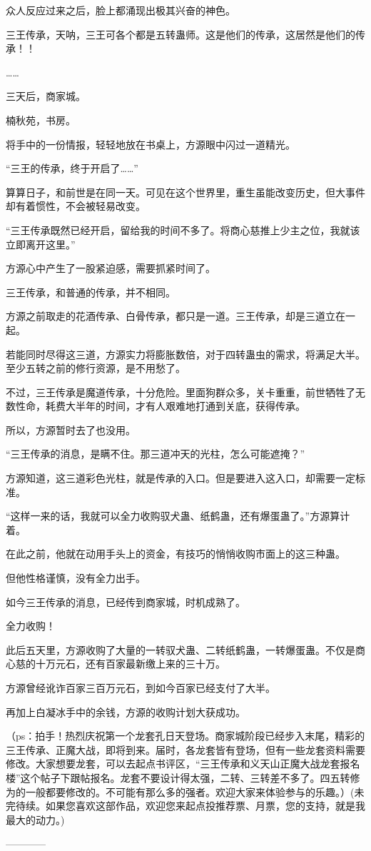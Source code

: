 \begin{this_body}
众人反应过来之后，脸上都涌现出极其兴奋的神色。

三王传承，天呐，三王可各个都是五转蛊师。这是他们的传承，这居然是他们的传承！！

……

三天后，商家城。

楠秋苑，书房。

将手中的一份情报，轻轻地放在书桌上，方源眼中闪过一道精光。

“三王的传承，终于开启了……”

算算日子，和前世是在同一天。可见在这个世界里，重生虽能改变历史，但大事件却有着惯性，不会被轻易改变。

“三王传承既然已经开启，留给我的时间不多了。将商心慈推上少主之位，我就该立即离开这里。”

方源心中产生了一股紧迫感，需要抓紧时间了。

三王传承，和普通的传承，并不相同。

方源之前取走的花酒传承、白骨传承，都只是一道。三王传承，却是三道立在一起。

若能同时尽得这三道，方源实力将膨胀数倍，对于四转蛊虫的需求，将满足大半。至少五转之前的修行资源，是不用愁了。

不过，三王传承是魔道传承，十分危险。里面狗群众多，关卡重重，前世牺牲了无数性命，耗费大半年的时间，才有人艰难地打通到关底，获得传承。

所以，方源暂时去了也没用。

“三王传承的消息，是瞒不住。那三道冲天的光柱，怎么可能遮掩？”

方源知道，这三道彩色光柱，就是传承的入口。但是要进入这入口，却需要一定标准。

“这样一来的话，我就可以全力收购驭犬蛊、纸鹤蛊，还有爆蛋蛊了。”方源算计着。

在此之前，他就在动用手头上的资金，有技巧的悄悄收购市面上的这三种蛊。

但他性格谨慎，没有全力出手。

如今三王传承的消息，已经传到商家城，时机成熟了。

全力收购！

此后五天里，方源收购了大量的一转驭犬蛊、二转纸鹤蛊，一转爆蛋蛊。不仅是商心慈的十万元石，还有百家最新缴上来的三十万。

方源曾经讹诈百家三百万元石，到如今百家已经支付了大半。

再加上白凝冰手中的余钱，方源的收购计划大获成功。

（ps：拍手！热烈庆祝第一个龙套孔日天登场。商家城阶段已经步入末尾，精彩的三王传承、正魔大战，即将到来。届时，各龙套皆有登场，但有一些龙套资料需要修改。大家想要龙套，可以去起点书评区，“三王传承和义天山正魔大战龙套报名楼”这个帖子下跟帖报名。龙套不要设计得太强，二转、三转差不多了。四五转修为的一般都要修改的。不可能有那么多的强者。欢迎大家来体验参与的乐趣。）(未完待续。如果您喜欢这部作品，欢迎您来起点投推荐票、月票，您的支持，就是我最大的动力。)

------------

\end{this_body}

